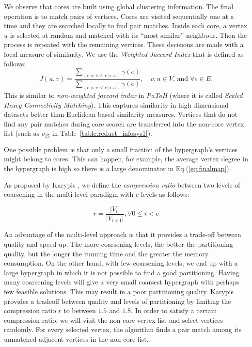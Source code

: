 \documentclass[twocolumn]{svjour3}          \smartqed
\begin{document}
We observe that cores are built using global clustering information. The final operation is to match pairs of vertices. Cores are visited sequentially one at a time and they are searched locally to find pair matches. Inside each core, a vertex $u$ is selected at random and matched with its ``most similar'' neighbour.  Then the process is repeated with the remaining vertices.  These decisions are made with a local measure of similarity. We use the \textit{Weighted Jaccard Index} that is defined as follows:
\begin{equation}
\label{eq:w_jaccard}
J \left( u,v \right) = \frac{\sum_{\left\lbrace e \triangleright v \, \wedge \, e \triangleright u\right\rbrace} \gamma \left( e \right) }{\sum_{\left\lbrace e \triangleright v \, \vee \, e \triangleright u\right\rbrace} \gamma(e)}, \quad v,u \in V \mbox{, and} \; \forall e \in E.
\end{equation}
This is similar to \textit{non-weighted jaccard index} in \textit{PaToH} (where it is called \emph{Scaled Heavy Connectivity Matching}). This captures similarity in high dimensional datasets better than Euclidean based similarity measures. Vertices that do not find any pair matches during core search are transferred into the non-core vertex list (such as $v_{15}$ in Table~\ref{table:reduct_infosys1}).

One possible problem is that only a small fraction of the hypergraph's vertices might belong to cores. This can happen, for example, the average vertex degree in the hypergraph is high so there is a  large denominator in Eq.(\ref{eq:finalmap}). 

As proposed by Karypis \cite{karytech2002}, we define the \textit{compression ratio} between two levels of coarsening in the multi-level paradigm with $c$ levels as follows:

\begin{equation}\label{eq:comp_ratio}
	r = \frac{\vert V_{i} \vert}{\vert V_{i+1}\vert}, \forall 0 \leqslant i < c
\end{equation}

An advantage of the multi-level approach is that it provides a trade-off between quality and speed-up. The more coarsening levels, the better the partitioning quality, but the longer the running time and the greater the memory consumption. On the other hand, with few coarsening levels, we end up with a large hypergraph in which it is not possible to find a good partitioning.  Having many coarsening levels will give a very small coarsest hypergraph with perhaps few feasible solutions.  This may result in a poor partitioning quality. Karypis \cite{karytech2002} provides a tradeoff between quality and levels of partitioning by limiting the compression ratio $r$ to between $1.5$ and  $1.8$.  In order to satisfy a certain compression ratio, we will visit the non-core vertex list and select vertices randomly. For every selected vertex, the algorithm finds a pair match among its unmatched adjacent vertices in the non-core list.
\end{document}

